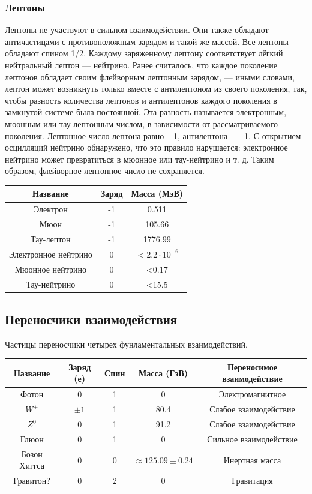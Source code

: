 \documentclass[a4paper,14pt]{article}
\begin{document}
\subsubsection*{Лептоны}

Лептоны не участвуют в сильном взаимодействии. Они также обладают античастицами с противоположным зарядом и такой же массой. Все лептоны обладают спином 1/2. Каждому заряженному лептону соответствует лёгкий нейтральный лептон — нейтрино. Ранее считалось, что каждое поколение лептонов обладает своим флейворным лептонным зарядом, — иными словами, лептон может возникнуть только вместе с антилептоном из своего поколения, так, чтобы разность количества лептонов и антилептонов каждого поколения в замкнутой системе была постоянной. Эта разность называется электронным, мюонным или тау-лептонным числом, в зависимости от рассматриваемого поколения. Лептонное число лептона равно +1, антилептона — -1. С открытием осцилляций нейтрино обнаружено, что это правило нарушается: электронное нейтрино может превратиться в мюонное или тау-нейтрино и т. д. Таким образом, флейворное лептонное число не сохраняется.

\begin{center}
\begin{tabular}{|c|c|c|}
\hline
Название&Заряд&Масса (МэВ)\\
\hline
Электрон&-1&0.511\\
\hline
Мюон&-1&105.66\\
\hline
Тау-лептон&-1&1776.99\\
\hline
Электронное нейтрино&0&$<2.2 \cdot 10^{-6}$\\
\hline
Мюонное нейтрино&0&<0.17\\
\hline
Тау-нейтрино&0&<15.5\\
\hline
\end{tabular}
\end{center}

\subsection*{Переносчики взаимодействия}

Частицы переносчики четырех фунламентальных взаимодействий. 
\begin{center}
\begin{tabular}{|c|c|c|c|c|}
\hline
Название&Заряд (е)&Спин&Масса (ГэВ)&Переносимое взаимодействие\\
\hline
Фотон&0&1&0&Электромагнитное\\
\hline
$W^{\pm}$&$\pm 1$&1&80.4&Слабое взаимодействие\\
\hline
$Z^0$&0&1&91.2&Слабое взаимодействие\\
\hline
Глюон&0&1&0&Сильное взаимодействие\\
\hline
Бозон Хиггса&0&0&$\approx 125.09 \pm 0.24$&Инертная масса\\
\hline
Гравитон?&0&2&0&Гравитация\\
\hline
\end{tabular}
\end{center}
\end{document}
